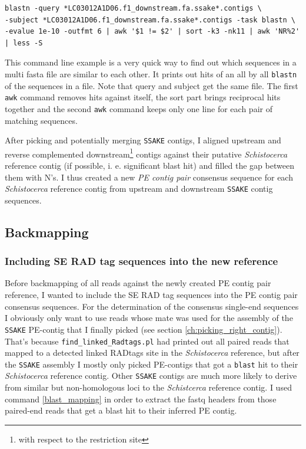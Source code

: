 \documentclass[a4paper,12pt,times,print,index,custombib,custommargin]{PhDThesisPSnPDF}\usepackage[]{graphicx}\usepackage[]{color}
\begin{document}
\begin{cmd}
\captionsetup{type=cmd}
\begin{Verbatim}[fontsize=\scriptsize, formatcom=\color{darkgray}]
blastn -query *LC03012A1D06.f1_downstream.fa.ssake*.contigs \
-subject *LC03012A1D06.f1_downstream.fa.ssake*.contigs -task blastn \
-evalue 1e-10 -outfmt 6 | awk '$1 != $2' | sort -k3 -nk11 | awk 'NR%2' | less -S
\end{Verbatim}
\caption{\small This command line example is a very quick way to find out which sequences in a multi fasta file are similar to each other. It prints out hits of an all by all \texttt{blastn} of the sequences in a file. Note that query and subject get the same file. The first \texttt{awk} command removes hits against itself, the sort part brings reciprocal hits together and the second \texttt{awk} command keeps only one line for each pair of matching sequences.}
\label{blastn}
\end{cmd}

After picking and potentially merging \texttt{SSAKE} contigs, I aligned upstream and reverse complemented downstream\footnote{with respect to the restriction site} contigs against their putative \textit{Schistocerca} reference contig (if possible, i. e. significant blast hit) and filled the gap between them with N's. I thus created a new \emph{PE contig pair} consensus sequence for each \textit{Schistocerca} reference contig from upstream and downstream \texttt{SSAKE} contig sequences. 

\FloatBarrier
\subsection{Backmapping}\label{ch:Backmapping}

\subsubsection{Including SE RAD tag sequences into the new reference}

Before backmapping of all reads against the newly created PE contig pair reference, I wanted to include the SE \gls{RAD tag} sequences into the PE contig pair consensus sequences. For the determination of the consensus single-end sequences I obviously only want to use reads whose mate was used for the assembly of the \texttt{SSAKE} PE-contig that I finally picked (see section \ref{ch:picking_right_contig}). That's because \texttt{find\_linked\_Radtags.pl} had printed out all paired reads that mapped to a detected linked RADtags site in the \textit{Schistocerca} reference, but after the \texttt{SSAKE} assembly I mostly only picked PE-contigs that got a \texttt{blast} hit to their \textit{Schistocerca} reference contig. Other \texttt{SSAKE} contigs are much more likely to derive from similar but non-homologous loci to the \textit{Schistcerca} reference contig. I used command \ref{blast_mapping} in order to extract the fastq headers from those paired-end reads that get a blast hit to their inferred PE contig.
\end{document}
